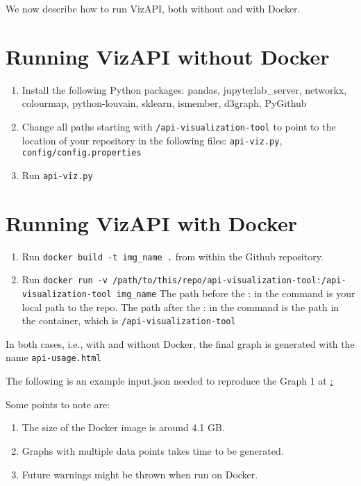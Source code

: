\documentclass[conference]{IEEEtran}
\begin{document}
We now describe how to run VizAPI, both without and with Docker.
\begin{sloppypar}
\section{Running VizAPI without Docker}
\begin{enumerate}
\item Install the following Python packages: pandas, jupyterlab\_server, networkx, colourmap, python-louvain, sklearn, ismember, d3graph, PyGithub
\item Change all paths starting with \texttt{/api-visualization-tool} to point to the location of your repository in the following files: \texttt{api-viz.py}, \texttt{config/config.properties}
\item Run \texttt{api-viz.py}
\end{enumerate}

\section{Running VizAPI with Docker}
\begin{enumerate}
\item Run \texttt{docker build -t img_name .} from within the Github repository.
\item Run \texttt{docker run -v /path/to/this/repo/api-visualization-tool:/api-visualization-tool img_name} The path before the : in the command is your local path to the repo. The path after the : in the command is the path in the container, which is \texttt{/api-visualization-tool}
\end{enumerate}
\end{sloppypar}
In both cases, i.e., with and without Docker, the final graph is generated with the name \texttt{api-usage.html}

The following is an example input.json needed to reproduce the Graph 1 at \href{https://sruthivenkat.github.io/VizAPI-graph/}:


Some points to note are:
\begin{enumerate}
\item The size of the Docker image is around 4.1 GB.
\item Graphs with multiple data points takes time to be generated.
\item Future warnings might be thrown when run on Docker.
\end{enumerate}
\end{document}
